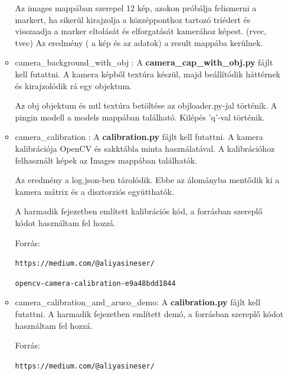 \begin{itemize}
\begin{itemize}
Az images mappában szerepel 12 kép, azokon próbálja felismerni a markert, ha sikerül kirajzolja a közzépponthoz
tartozó triédert és visszaadja a marker eltolását és elforgatását kamerához képest. (rvec, tvec)
Az eredmény ( a kép és az adatok) a result mappába kerülnek.
\item camera\_background\_with\_obj :
A \textbf{camera\_cap\_with\_obj.py} fájlt kell futattni.
A kamera képből textúra készül, majd beállítódik háttérnek és kirajzolódik rá egy objektum.

Az obj objektum és mtl textúra betöltése az objloader.py-jal történik.
A pingin modell a models mappában található.
Kilépés 'q'-val történik.
\item camera\_calibration :
A \textbf{calibration.py} fájlt kell futattni.
A kamera kalibrációja OpenCV és sakktábla minta használatával.
A kalibrációhoz felhasznált képek az Images mappában találhatók.

Az eredmény a log.json-ben tárolódik.
Ebbe az álományba mentődik ki a kamera mátrix és a disztorziós együtthatók.

A harmadik fejezetben említett kalibrációs kód, a forrásban szereplő kódot használtam fel hozzá. 

Forrás: 

\texttt{https://medium.com/@aliyasineser/}

\texttt{opencv-camera-calibration-e9a48bdd1844}
\item camera\_calibration\_and\_aruco\_demo:
A \textbf{calibration.py} fájlt kell futattni.
A harmadik fejezetben említett demó, a forrásban szereplő kódot használtam fel hozzá. 

Forrás: 

\texttt{https://medium.com/@aliyasineser/}


\end{itemize}
\end{itemize}
